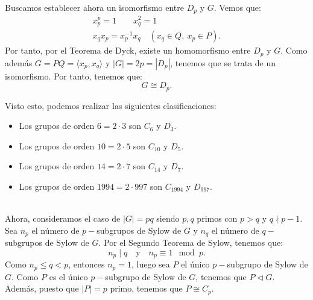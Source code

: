 \begin{ejercicio}
\begin{itemize}
        Buscamos establecer ahora un isomorfismo entre $D_p$ y $G$. Vemos que:
        \begin{gather*}
            x_p^{p} = 1\qquad
            x_q^{2} = 1\\
            x_q x_p = x_p^{-1} x_q\quad (x_q\in Q,\ x_p\in P).
        \end{gather*}
        Por tanto, por el Teorema de Dyck, existe un homomorfismo entre $D_p$ y $G$. Como además $G=PQ=\langle x_p, x_q\rangle$ y $|G|=2p=|D_p|$, tenemos que se trata de un isomorfismo. Por tanto, tenemos que:
        \begin{equation*}
            G\cong D_p.
        \end{equation*}
    \end{itemize}

    Visto esto, podemos realizar las siguientes clasificaciones:
    \begin{itemize}
        \item Los grupos de orden \(6=2\cdot 3\) son $C_6$ y \(D_3\).
        \item Los grupos de orden \(10=2\cdot 5\) son \(C_{10}\) y \(D_5\).
        \item Los grupos de orden \(14=2\cdot 7\) son \(C_{14}\) y \(D_7\).
        \item Los grupos de orden \(1994=2\cdot 997\) son \(C_{1994}\) y \(D_{997}\).
    \end{itemize}~\\

    Ahora, consideramos el caso de \(|G|=pq\) siendo \(p, q\) primos con \(p > q\) y \(q \nmid p - 1\). Sea $n_p$ el número de \(p-\)subgrupos de Sylow de \(G\) y $n_q$ el número de \(q-\)subgrupos de Sylow de \(G\). Por el Segundo Teorema de Sylow, tenemos que:
    \begin{equation*}
        n_p\mid q \quad \text{y} \quad n_p \equiv 1 \mod p.
    \end{equation*}
    Como $n_p\leq q<p$, entonces $n_p=1$, luego sea \(P\) el único \(p-\)subgrupo de Sylow de \(G\). Como \(P\) es el único \(p-\)subgrupo de Sylow de \(G\), tenemos que \(P\lhd G\). Además, puesto que \(|P|=p\) primo, tenemos que $P\cong C_p$.\\


\end{ejercicio}
